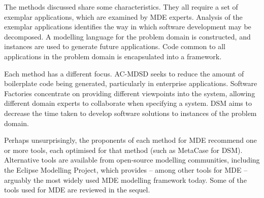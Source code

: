 The methods discussed share some characteristics. They all require a set of exemplar applications, which are examined by MDE experts. Analysis of the exemplar applications identifies the way in which software development may be decomposed. A modelling language for the problem domain is constructed, and instances are used to generate future applications. Code common to all applications in the problem domain is encapsulated into a framework.

Each method has a different focus. AC-MDSD seeks to reduce the amount of boilerplate code being generated, particularly in enterprise applications. Software Factories concentrate on providing different viewpoints into the system, allowing different domain experts to collaborate when specifying a system. DSM aims to decrease the time taken to develop software solutions to instances of the problem domain.

Perhaps unsurprisingly, the proponents of each method for MDE recommend one or more tools, each optimised for that method (such as MetaCase for DSM). Alternative tools are available from open-source modelling communities, including the Eclipse Modelling Project, which provides -- among other tools for MDE -- arguably the most widely used MDE modelling framework today. Some of the tools used for MDE are reviewed in the sequel.